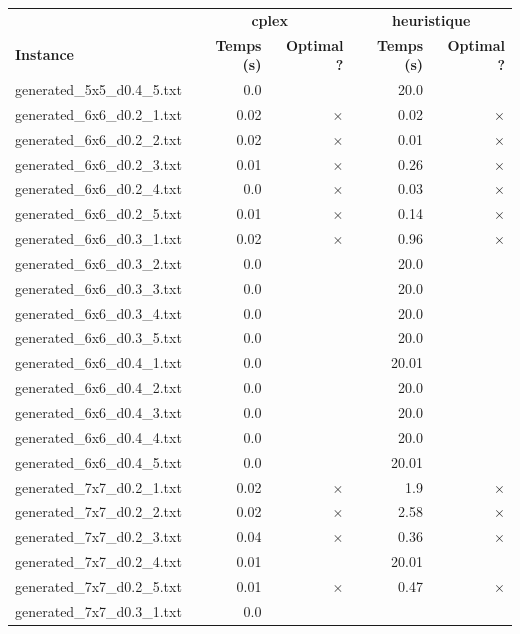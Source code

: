 \documentclass{article}
\begin{document}
\newpage
\begin{center}
\renewcommand{\arraystretch}{1.4} 
 \begin{tabular}{lrrrr}
	\hline
 & \multicolumn{2}{c}{\textbf{cplex}} & \multicolumn{2}{c}{\textbf{heuristique}}\\
\textbf{Instance}  & \textbf{Temps (s)} & \textbf{Optimal ?}  & \textbf{Temps (s)} & \textbf{Optimal ?} \\\hline

generated\_5x5\_d0.4\_5.txt & 0.0 & 
 & 20.0 & 
\\
generated\_6x6\_d0.2\_1.txt & 0.02 & 
$\times$
 & 0.02 & 
$\times$
\\
generated\_6x6\_d0.2\_2.txt & 0.02 & 
$\times$
 & 0.01 & 
$\times$
\\
generated\_6x6\_d0.2\_3.txt & 0.01 & 
$\times$
 & 0.26 & 
$\times$
\\
generated\_6x6\_d0.2\_4.txt & 0.0 & 
$\times$
 & 0.03 & 
$\times$
\\
generated\_6x6\_d0.2\_5.txt & 0.01 & 
$\times$
 & 0.14 & 
$\times$
\\
generated\_6x6\_d0.3\_1.txt & 0.02 & 
$\times$
 & 0.96 & 
$\times$
\\
generated\_6x6\_d0.3\_2.txt & 0.0 & 
 & 20.0 & 
\\
generated\_6x6\_d0.3\_3.txt & 0.0 & 
 & 20.0 & 
\\
generated\_6x6\_d0.3\_4.txt & 0.0 & 
 & 20.0 & 
\\
generated\_6x6\_d0.3\_5.txt & 0.0 & 
 & 20.0 & 
\\
generated\_6x6\_d0.4\_1.txt & 0.0 & 
 & 20.01 & 
\\
generated\_6x6\_d0.4\_2.txt & 0.0 & 
 & 20.0 & 
\\
generated\_6x6\_d0.4\_3.txt & 0.0 & 
 & 20.0 & 
\\
generated\_6x6\_d0.4\_4.txt & 0.0 & 
 & 20.0 & 
\\
generated\_6x6\_d0.4\_5.txt & 0.0 & 
 & 20.01 & 
\\
generated\_7x7\_d0.2\_1.txt & 0.02 & 
$\times$
 & 1.9 & 
$\times$
\\
generated\_7x7\_d0.2\_2.txt & 0.02 & 
$\times$
 & 2.58 & 
$\times$
\\
generated\_7x7\_d0.2\_3.txt & 0.04 & 
$\times$
 & 0.36 & 
$\times$
\\
generated\_7x7\_d0.2\_4.txt & 0.01 & 
 & 20.01 & 
\\
generated\_7x7\_d0.2\_5.txt & 0.01 & 
$\times$
 & 0.47 & 
$\times$
\\
generated\_7x7\_d0.3\_1.txt & 0.0 & 

\end{tabular}
\end{center}
\end{document}
